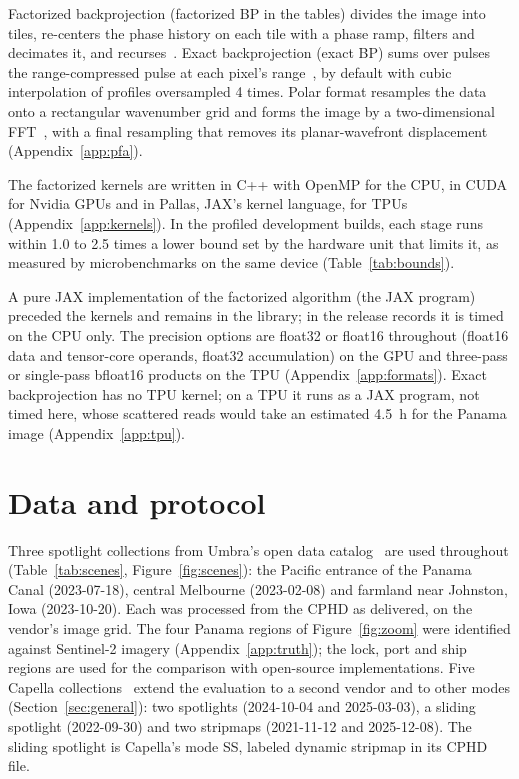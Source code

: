 \documentclass[11pt]{article}
\begin{document}
Factorized backprojection (factorized BP in the tables) divides the image into tiles, re-centers the phase history on each tile with a phase ramp, filters and decimates it, and recurses~\cite{mccorkle1996,ulander2003}. Exact backprojection (exact BP) sums over pulses the range-compressed pulse at each pixel's range~\cite{gorham2010}, by default with cubic interpolation of profiles oversampled 4 times. Polar format resamples the data onto a rectangular wavenumber grid and forms the image by a two-dimensional FFT~\cite{carrara1995,jakowatz1996}, with a final resampling that removes its planar-wavefront displacement (Appendix~\ref{app:pfa}).

The factorized kernels are written in C++ with OpenMP for the CPU, in CUDA for Nvidia GPUs and in Pallas, JAX's kernel language, for TPUs (Appendix~\ref{app:kernels}). In the profiled development builds, each stage runs within 1.0 to 2.5 times a lower bound set by the hardware unit that limits it, as measured by microbenchmarks on the same device (Table~\ref{tab:bounds}).

A pure JAX implementation of the factorized algorithm (the JAX program) preceded the kernels and remains in the library; in the release records it is timed on the CPU only. The precision options are float32 or float16 throughout (float16 data and tensor-core operands, float32 accumulation) on the GPU and three-pass or single-pass bfloat16 products on the TPU (Appendix~\ref{app:formats}). Exact backprojection has no TPU kernel; on a TPU it runs as a JAX program, not timed here, whose scattered reads would take an estimated 4.5~h for the Panama image (Appendix~\ref{app:tpu}).

\section{Data and protocol}
\label{sec:protocol}

Three spotlight collections from Umbra's open data catalog~\cite{umbra2023} are used throughout (Table~\ref{tab:scenes}, Figure~\ref{fig:scenes}): the Pacific entrance of the Panama Canal (2023-07-18), central Melbourne (2023-02-08) and farmland near Johnston, Iowa (2023-10-20). Each was processed from the CPHD as delivered, on the vendor's image grid. The four Panama regions of Figure~\ref{fig:zoom} were identified against Sentinel-2 imagery (Appendix~\ref{app:truth}); the lock, port and ship regions are used for the comparison with open-source implementations. Five Capella collections~\cite{capella2023} extend the evaluation to a second vendor and to other modes (Section~\ref{sec:general}): two spotlights (2024-10-04 and 2025-03-03), a sliding spotlight (2022-09-30) and two stripmaps (2021-11-12 and 2025-12-08). The sliding spotlight is Capella's mode SS, labeled dynamic stripmap in its CPHD file.
\end{document}

